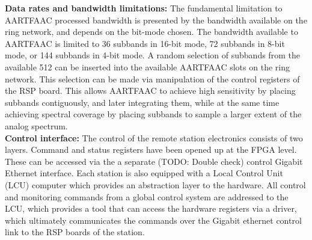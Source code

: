 \documentclass{ws-jai}
\begin{document}
\noindent \textbf {Data rates and  bandwidth limitations: }
The fundamental limitation  to AARTFAAC processed bandwidth is  presented by the
bandwidth available  on the ring  network, and  depends on the  bit-mode chosen.
The bandwidth available to AARTFAAC is limited to 36 subbands in 16-bit mode, 72
subbands in 8-bit  mode, or 144 subbands  in 4-bit mode.  A  random selection of
subbands from  the available  512 can  be inserted  into the  available AARTFAAC
slots on the ring  network.  This selection can be made  via manipulation of the
control  registers of  the  RSP board.   This allows  AARTFAAC  to achieve  high
sensitivity by placing subbands contiguously,  and later integrating them, while
at the  same time achieving  spectral coverage by  placing subbands to  sample a
larger extent of the analog spectrum.\\


\noindent  \textbf  {Control  interface:}  The control  of  the  remote  station
electronics  consists of  two layers.  Command  and status  registers have  been
opened up at  the FPGA level.  These  can be accessed via the  a separate (TODO:
Double check) control Gigabit Ethernet  interface. Each station is also equipped
with a Local Control Unit (LCU)  computer which provides an abstraction layer to
the hardware. All  control and monitoring commands from a  global control system
are addressed  to the LCU,  which provides a tool  that can access  the hardware
registers  via a  driver, which  ultimately communicates  the commands  over the
Gigabit ethernet control link to the RSP boards of the station.

\end{document}
